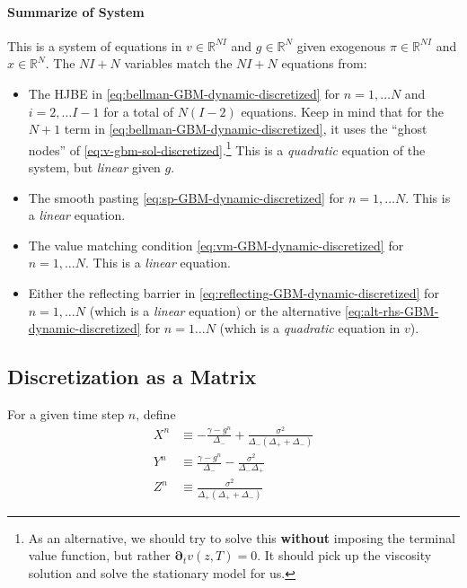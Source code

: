 \documentclass[11pt]{article}
\newcommand{\D}[1][]{\ensuremath{\boldsymbol{\partial}_{#1}}}
\newcommand{\R}{\ensuremath{\mathbb{R}}}
\newcommand{\set}[1]{\ensuremath{\left\{{#1}\right\}}}
\begin{document}
\paragraph{Summarize of System} This is a system of equations in $v\in\R^{N I}$ and $g\in \R^N$ given exogenous $\pi\in\R^{N I}$ and $x \in \R^N$.  The $N I + N$ variables match the $N I + N$ equations from:
\begin{itemize}
	\item The HJBE in  \cref{eq:bellman-GBM-dynamic-discretized} for $n=1,\ldots N$ and $i = 2,\ldots I-1$ for a total of $N(I-2)$ equations.  Keep in mind that for the $N+1$ term in \cref{eq:bellman-GBM-dynamic-discretized}, it uses the ``ghost nodes'' of \cref{eq:v-gbm-sol-discretized}.\footnote{As an alternative, we should try to solve this \textbf{without} imposing the terminal value function, but rather $\D[t]v(z,T) = 0$.  It should pick up the viscosity solution and solve the stationary model for us.}  This is a \textit{quadratic} equation of the system, but \textit{linear} given $g$.
	\item The smooth pasting \cref{eq:sp-GBM-dynamic-discretized} for $n=1,\ldots N$.  This is a \textit{linear} equation.
	\item The value matching condition \cref{eq:vm-GBM-dynamic-discretized} for $n=1,\ldots N$.  This is a \textit{linear} equation.
	\item Either the reflecting barrier in \cref{eq:reflecting-GBM-dynamic-discretized} for $n=1,\ldots N$ (which is a \textit{linear} equation) or the alternative  \cref{eq:alt-rhs-GBM-dynamic-discretized} for $n=1\ldots N$ (which is a \textit{quadratic} equation in $v$).
\end{itemize}

\subsection{Discretization as a Matrix}
For a given time step $n$, define
\begin{align}
X^n &\equiv -\frac{\gamma - g^n}{\Delta_{-}} +\frac{\sigma^2}{\Delta_{-}(\Delta_{+}+\Delta_{-})} \label{eq:X-non-uniform}\\
Y^n &\equiv \frac{\gamma - g^n}{\Delta_{-}} -\frac{\sigma^2}{\Delta_{-}\Delta_{+}}  \label{eq:Y-non-uniform}\\
Z^n &\equiv\frac{\sigma^2}{\Delta_{+}(\Delta_{+}+\Delta_{-})} \label{eq:Z-non-uniform}
\end{align}
\end{document}
